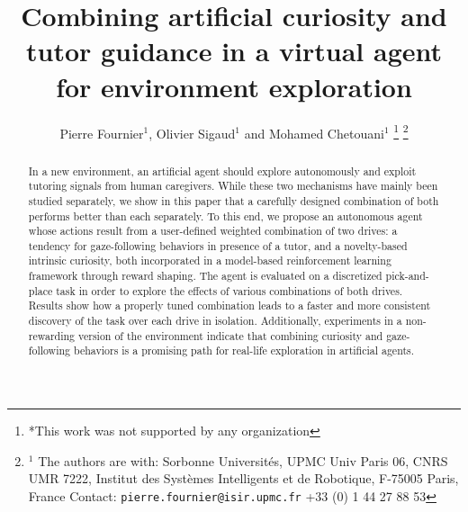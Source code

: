 \documentclass[letterpaper, 10 pt, conference]{ieeeconf}  %
\title{\LARGE \bf Combining artificial curiosity and tutor guidance in a virtual agent for environment exploration}
\author{Pierre Fournier$^{1}$, Olivier Sigaud$^{1}$ and Mohamed Chetouani$^{1}$%
\thanks{*This work was not supported by any organization}%
\thanks{$^{1}$ The authors are with: Sorbonne Universit\'es, UPMC Univ Paris 06, CNRS UMR 7222, Institut des Syst\`emes Intelligents et de Robotique, F-75005 Paris, France Contact: {\tt pierre.fournier@isir.upmc.fr} +33 (0) 1 44 27 88 53}%
}
\begin{document}
\maketitle
\thispagestyle{empty}
\pagestyle{empty}

\begin{abstract}
In a new environment, an artificial agent should explore autonomously and exploit tutoring signals from human caregivers. While these two mechanisms have mainly been studied separately, we show in this paper that a carefully designed combination of both performs better than each separately. To this end, we propose an autonomous agent whose actions result from a user-defined weighted combination of two drives: a tendency for gaze-following behaviors in presence of a tutor, and a novelty-based intrinsic curiosity, both incorporated in a model-based reinforcement learning framework through reward shaping. The agent is evaluated on a discretized pick-and-place task in order to explore the effects of various combinations of both drives. Results show how a properly tuned combination leads to a faster and more consistent discovery of the task over each drive in isolation. Additionally, experiments in a non-rewarding version of the environment indicate that combining curiosity and gaze-following behaviors is a promising path for real-life exploration in artificial agents.

\end{abstract}
\end{document}
